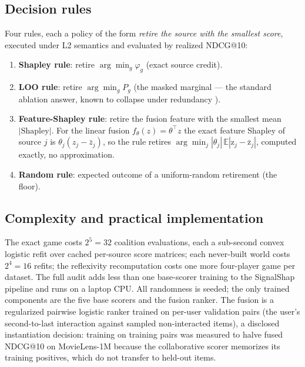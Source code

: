 \documentclass[pdflatex,sn-mathphys-num]{sn-jnl}
\theoremstyle{thmstyleone}%
\theoremstyle{thmstyletwo}%
\theoremstyle{thmstylethree}%
\newcommand{\pred}{P}
\begin{document}
\subsection{Decision rules}\label{subsec3_4}

Four rules, each a policy of the form \emph{retire the source with the smallest score}, executed under L2 semantics and evaluated by realized NDCG@10:

\begin{enumerate}
\item \textbf{Shapley rule}: retire $\arg\min_g \varphi_g$ (exact source credit).
\item \textbf{LOO rule}: retire $\arg\min_g \pred_g$ (the masked marginal --- the standard ablation answer, known to collapse under redundancy \cite{louhichi2026signalshap}).
\item \textbf{Feature-Shapley rule}: retire the fusion feature with the smallest mean $|\text{Shapley}|$. For the linear fusion $f_\theta(z)=\theta^\top z$ the exact feature Shapley of source $j$ is $\theta_j(z_j - \bar{z}_j)$, so the rule retires $\arg\min_j |\theta_j|\,\mathbb{E}|\mathrm{z}_j - \bar{\mathrm{z}}_j|$, computed exactly, no approximation.
\item \textbf{Random rule}: expected outcome of a uniform-random retirement (the floor).
\end{enumerate}

\subsection{Complexity and practical implementation}\label{subsec3_5}

The exact game costs $2^5=32$ coalition evaluations, each a sub-second convex logistic refit over cached per-source score matrices; each never-built world costs $2^4=16$ refits; the reflexivity recomputation costs one more four-player game per dataset. The full audit adds less than one base-scorer training to the SignalShap pipeline and runs on a laptop CPU. All randomness is seeded; the only trained components are the five base scorers and the fusion ranker. The fusion is a regularized pairwise logistic ranker trained on per-user validation pairs (the user's second-to-last interaction against sampled non-interacted items), a disclosed instantiation decision: training on training pairs was measured to halve fused NDCG@10 on MovieLens-1M because the collaborative scorer memorizes its training positives, which do not transfer to held-out items.
\end{document}
